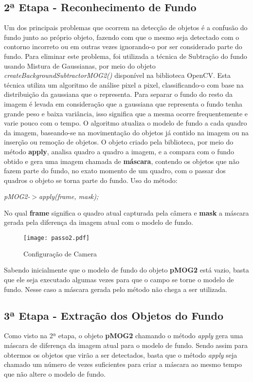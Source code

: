 	\subsection{2ª Etapa - Reconhecimento de Fundo}
	Um dos principais problemas que ocorrem na detecção de objetos é a confusão do fundo junto ao próprio objeto, fazendo com que o mesmo seja detectado com o contorno incorreto ou em outras vezes ignorando-o por ser considerado parte do fundo. Para eliminar este problema, foi utilizada a técnica de Subtração do fundo usando Mistura de Gaussianas, por meio do objeto \textit{createBackgroundSubtractorMOG2()} disponível na biblioteca OpenCV. Esta técnica utiliza um algoritmo de análise pixel a pixel, classificando-o com base na distribuição da gaussiana que o representa. Para separar o fundo do resto da imagem é levada em consideração que a gaussiana que representa o fundo tenha grande peso e baixa variância, isso significa que a mesma ocorre frequentemente e varie pouco com o tempo. O algoritmo atualiza o modelo de fundo a cada quadro da imagem, baseando-se na movimentação do objetos já contido na imagem ou na inserção ou remoção de objetos. O objeto criado pela biblioteca, por meio do método \textbf{apply}, analisa quadro a quadro a imagem, e a compara com o fundo obtido e gera uma imagem chamada de \textbf{máscara}, contendo os objetos que não fazem parte do fundo, no exato momento de um quadro, com o passar dos quadros o objeto se torna parte do fundo. Uso do método:
\begin{center}
 \textit{pMOG2-$>$apply(frame, mask);}

\end{center}

No qual \textbf{frame} significa o quadro atual capturada pela câmera e \textbf{mask} a máscara gerada pela diferença da imagem atual com o modelo de fundo. 

\begin{figure}[H]
			\centering
			\texttt{[image: passo2.pdf]}
			\caption{Configuração de Camera}
			\label{Configuracao}
		\end{figure}		


Sabendo inicialmente que o modelo de fundo do objeto \textbf{pMOG2} está vazio, basta que ele seja executado algumas vezes para que o campo se torne o modelo de fundo. Nesse caso a máscara gerada pelo método não chega a ser utilizada.
	\subsection{3ª Etapa - Extração dos Objetos do Fundo}
	Como visto na 2ª etapa, o objeto \textbf{pMOG2} chamando o método \textit{apply} gera uma máscara de diferença da imagem atual para o modelo de fundo. Sendo assim para obtermos os objetos que virão a ser detectados, basta que o método \textit{apply} seja chamado um número de vezes suficientes para criar a máscara ao mesmo tempo que não altere o modelo de fundo.
	

